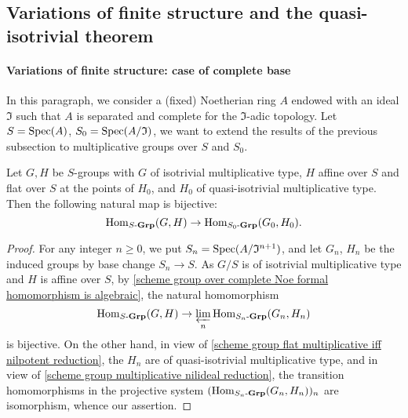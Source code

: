 \subsection{Variations of finite structure and the quasi-isotrivial theorem}\label{scheme group multiplicative quasi-isotrivial theorem subsection}
\paragraph{Variations of finite structure: case of complete base} In this paragraph, we consider a (fixed) Noetherian ring $A$ endowed with an ideal $\mathfrak{I}$ such that $A$ is separated and complete for the $\mathfrak{I}$-adic topology. Let $S=\mathrm{Spec}(A)$, $S_0=\mathrm{Spec}(A/\mathfrak{I})$, we want to extend the results of the previous subsection to multiplicative groups over $S$ and $S_0$.

\begin{lemma}\label{scheme group over Noe complete homomorphism reduction}
Let $G,H$ be $S$-groups with $G$ of isotrivial multiplicative type, $H$ affine over $S$ and flat over $S$ at the points of $H_0$, and $H_0$ of quasi-isotrivial multiplicative type. Then the following natural map is bijective:
\[\mathrm{Hom}_{S\textup{-}\mathbf{Grp}}(G,H)\to\mathrm{Hom}_{S_0\textup{-}\mathbf{Grp}}(G_0,H_0).\]
\end{lemma}
\begin{proof}
For any integer $n\geq 0$, we put $S_n=\mathrm{Spec}(A/\mathfrak{I}^{n+1})$, and let $G_n$, $H_n$ be the induced groups by base change $S_n\to S$. As $G/S$ is of isotrivial multiplicative type and $H$ is affine over $S$, by \cref{scheme group over complete Noe formal homomorphism is algebraic}, the natural homomorphism
\[\mathrm{Hom}_{S\textup{-}\mathbf{Grp}}(G,H)\to\varprojlim_n\mathrm{Hom}_{S_n\textup{-}\mathbf{Grp}}(G_n,H_n)\]
is bijective. On the other hand, in view of \cref{scheme group flat multiplicative iff nilpotent reduction}, the $H_n$ are of quasi-isotrivial multiplicative type, and in view of \cref{scheme group multiplicative nilideal reduction}, the transition homomorphisms in the projective system $(\mathrm{Hom}_{S_n\textup{-}\mathbf{Grp}}(G_n,H_n))_n$ are isomorphism, whence our assertion.
\end{proof}

